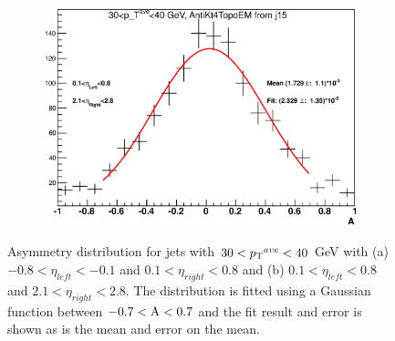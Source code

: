 \begin{figure}
        \begin{subfigure}[b]{0.8\textwidth}
                \centering
                \includegraphics[width=\textwidth]{figures/JetPerformance/2011/j15zvar6_9.eps}
        \end{subfigure}%
\caption[Example asymmetry distribution for jets with $30<\ptave{}<40$ GeV]{
Asymmetry distribution for jets with $30<\ptave{}<40$ GeV with (a) $-0.8<\eta_{left}<-0.1$ and $0.1<\eta_{right}<0.8$ and (b)  $0.1<\eta_{left}<0.8$ and $2.1<\eta_{right}<2.8$.
The distribution is fitted using a Gaussian function between $\rm{-0.7<A<0.7}$ and the fit result and error is shown as is the mean and error on the mean. 
\label{JetPerf:Asym_j15}}
\end{figure}

